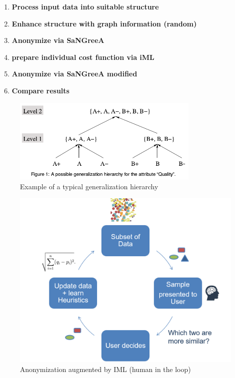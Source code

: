 	\begin{enumerate}
		\item \textbf{Process input data into suitable structure}
		\item \textbf{Enhance structure with graph information (random)}
		\item \textbf{Anonymize via SaNGreeA}
		\item \textbf{prepare individual cost function via iML}
		\item \textbf{Anonymize via SaNGreeA modified}
		\item \textbf{Compare results}
	\end{enumerate}
	
	\begin{figure}[ht]
		\label{fig_anonIML}
		\begin{center}
			\includegraphics[width=0.8\textwidth]{figures/anonym/gen_hierarchy}
			\caption{Example of a typical generalization hierarchy}
		\end{center}
	\end{figure}	
	
	\begin{figure}[ht]
		\label{fig_anonIML}
		\begin{center}
			\includegraphics[width=1\textwidth]{figures/anonym/anonIML}
			\caption{Anonymization augmented by IML (human in the loop)}
		\end{center}
	\end{figure}


